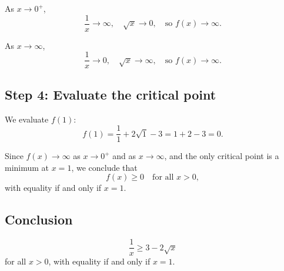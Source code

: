 \documentclass{article}
\begin{document}
As $x \to 0^+$,
\[
\frac{1}{x} \to \infty, \quad \sqrt{x} \to 0, \quad \text{so } f(x) \to \infty.
\]

As $x \to \infty$,
\[
\frac{1}{x} \to 0, \quad \sqrt{x} \to \infty, \quad \text{so } f(x) \to \infty.
\]

\subsection*{Step 4: Evaluate the critical point}

We evaluate $f(1)$:
\[
f(1) = \frac{1}{1} + 2\sqrt{1} - 3 = 1 + 2 - 3 = 0.
\]

Since $f(x) \to \infty$ as $x \to 0^+$ and as $x \to \infty$, and the only critical point is a minimum at $x = 1$, we conclude that
\[
f(x) \ge 0 \quad \text{for all } x > 0,
\]
with equality if and only if $x = 1$.

\subsection*{Conclusion}

\[
\frac{1}{x} \ge 3 - 2\sqrt{x}
\]
for all $x > 0$, with equality if and only if $x = 1$.
\end{document}
